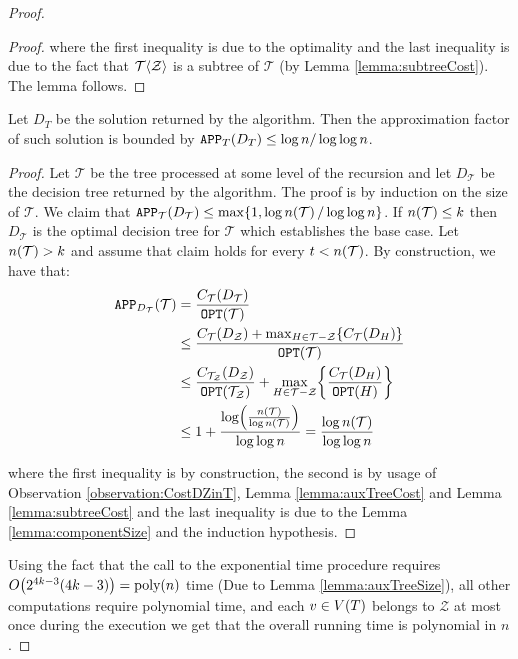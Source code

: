 \begin{theorem}
\begin{proof}
\begin{lemma}
\begin{proof}
        where the first inequality is due to the optimality and the last inequality is due to the fact that $\mathcal{T}\mathopen{}\langle \mathcal{Z} \rangle$ is a subtree of $\mathcal{T}$ (by Lemma \ref{lemma:subtreeCost}). The lemma follows.
    \end{proof}
\end{lemma}
\begin{lemma}
    Let $D_T$ be the solution returned by the algorithm. Then the approximation factor of such solution is bounded by 
    $
    \texttt{APP}_T\mathopen{}\left( D_T \right)\leq \log n/\log\log n
    $.
    \begin{proof}
        Let $\mathcal{T}$ be the tree processed at some level of the recursion and let $D_{\mathcal{T}}$ be the decision tree returned by the algorithm. The proof is by induction on the size of $\mathcal{T}$.  We claim that $\texttt{APP}_{\mathcal{T}}\mathopen{}\left( D_{\mathcal{T}} \right)\leq \max\mathopen{}\left\{ 1, \log n\mathopen{}\left( \mathcal{T} \right)/\log\log n \right\}$. If $n\mathopen{}\left( \mathcal{T} \right)\leq k$ then $D_{\mathcal{T}}$ is the optimal decision tree for $\mathcal{T}$ which establishes the base case. Let $n\mathopen{}\left( \mathcal{T} \right) > k$ and assume that claim holds for every $t< n\mathopen{}\left( \mathcal{T} \right)$. 
        By construction, we have that:
        \begin{align*}
        \texttt{APP}_{D_{\mathcal{T}}}\mathopen{}\left( \mathcal{T} \right)&=\frac{C_{\mathcal{T}}\mathopen{}\left( D_{\mathcal{T}} \right)}{\texttt{OPT}\mathopen{}\left( \mathcal{T} \right)}\\
        &\leq \frac{C_{\mathcal{T}}\mathopen{}\left( D_{\mathcal{Z}} \right)+\max_{H\in \mathcal{T}-\mathcal{Z}}\mathopen{}\left\{ C_{\mathcal{T}}\mathopen{}\left( D_H \right) \right\}}{\texttt{OPT}\mathopen{}\left( \mathcal{T} \right)}\\
        &\leq 
        \frac{C_{\mathcal{T}_{\mathcal{Z}}}\mathopen{}\left( D_{\mathcal{Z}} \right)}{\texttt{OPT}\mathopen{}\left( \mathcal{T}_{\mathcal{Z}} \right)}+\max_{H\in \mathcal{T}-\mathcal{Z}}\mathopen{}\left\{ \frac{C_{\mathcal{T}}\mathopen{}\left( D_H \right)}{\texttt{OPT}\mathopen{}\left( H \right)} \right\}\\
        &\leq 1+\frac{\log\mathopen{}\left( \frac{n\mathopen{}\left( \mathcal{T} \right)}{\log n\mathopen{}\left( \mathcal{T} \right)} \right)}{\log\log n}= \frac{\log n\mathopen{}\left( \mathcal{T} \right)}{\log\log n}
        \end{align*}

        where the first inequality is by construction, the second is by usage of Observation \ref{observation:CostDZinT}, Lemma \ref{lemma:auxTreeCost} and Lemma \ref{lemma:subtreeCost} and the last inequality is due to the Lemma \ref{lemma:componentSize} and the induction hypothesis.
    \end{proof}
\end{lemma}
    Using the fact that the call to the exponential time procedure requires $O\mathopen{}\left( 2^{4k-3}\mathopen{}\left( 4k-3 \right) \right)=\text{poly}\mathopen{}\left( n \right)$ time (Due to Lemma \ref{lemma:auxTreeSize}), all other computations require polynomial time, and each $v\in V\mathopen{}\left( T \right)$ belongs to $\mathcal{Z}$ at most once during the execution we get that the overall running time is polynomial in $n$.
    \end{proof}
\end{theorem}

